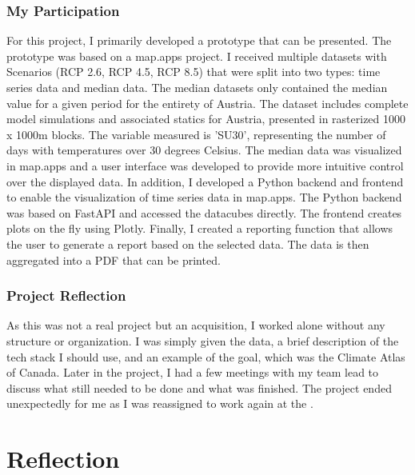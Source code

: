 \documentclass[11pt, titlepage, a4paper]{article}
\begin{document}
\subsubsection{My Participation}
For this project, I primarily developed a prototype that can be presented. The prototype was based on a map.apps project.    I received multiple datasets with  Scenarios (RCP 2.6, RCP 4.5, RCP 8.5) that were split into two types: time series data and median data. The median datasets only contained the median value for a given period for the entirety of Austria. The dataset includes complete model simulations and associated statics for Austria, presented in rasterized 1000 x 1000m blocks. The variable measured is 'SU30', representing the number of days with temperatures over 30 degrees Celsius.
The median data was visualized in map.apps and a user interface was developed to provide more intuitive control over the displayed data. In addition, I developed a Python backend and frontend to enable the visualization of time series data in map.apps. The Python backend was based on FastAPI and accessed the datacubes directly. The frontend creates plots on the fly using Plotly. Finally, I created a reporting function that allows the user to generate a report based on the selected data. The data is then aggregated into a PDF that can be printed.

\subsubsection{Project Reflection}
As this was not a real project but an acquisition, I worked alone without any structure or organization.  I was simply given the data, a brief description of the tech stack I should use, and an example of the goal, which was the Climate Atlas of Canada. Later in the project, I had a few meetings with my team lead to discuss what still needed to be done and what was finished. The project ended unexpectedly for me as I was reassigned to work again at the .
\section{Reflection}
\end{document}
